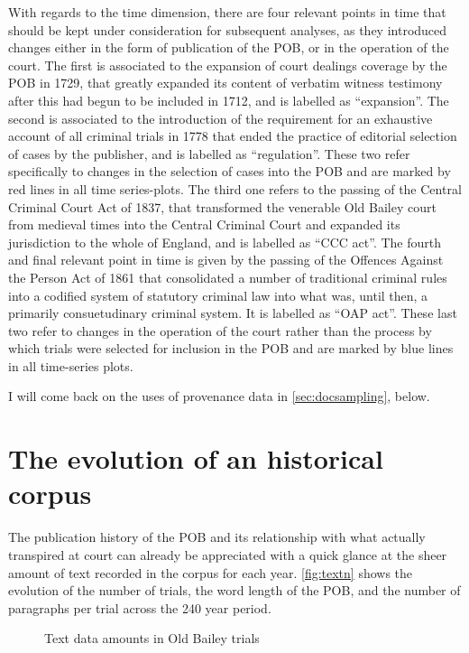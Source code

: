 With regards to the time dimension, there are four relevant points in time that should be kept under consideration for subsequent analyses, as they introduced changes either in the form of publication of the POB, or in the operation of the court.
The first is associated to the expansion of court dealings coverage by the POB in 1729, that greatly expanded its content of verbatim witness testimony after this had begun to be included in 1712, and is labelled as ``expansion''.
The second is associated to the introduction of the requirement for an exhaustive account of all criminal trials in 1778 that ended the practice of editorial selection of cases by the publisher, and is labelled as ``regulation''.
These two refer specifically to changes in the selection of cases into the POB and are marked by red lines in all time series-plots.
The third one refers to the passing of the Central Criminal Court Act of 1837, that transformed the venerable Old Bailey court from medieval times into the Central Criminal Court and expanded its jurisdiction to the whole of England, and is labelled as ``CCC act''.
The fourth and final relevant point in time is given by the passing of the Offences Against the Person Act of 1861 that consolidated a number of traditional criminal rules into a codified system of statutory criminal law into what was, until then, a primarily consuetudinary criminal system. It is labelled as ``OAP act''.
These last two refer to changes in the operation of the court rather than the process by which trials were selected for inclusion in the POB and are marked by blue lines in all time-series plots.

I will come back on the uses of provenance data in \autoref{sec:docsampling}, below.

\section{The evolution of an historical corpus}
\label{sec:lexstats}

The publication history of the POB and its relationship with what actually transpired at court can already be appreciated with a quick glance at the sheer amount of text recorded in the corpus for each year.
\autoref{fig:textn} shows the evolution of the number of trials, the word length of the POB, and the number of paragraphs per trial across the 240 year period.

\begin{figure}
    \centerfloat
    
    \caption{Text data amounts in Old Bailey trials}
    \label{fig:textn}
\end{figure}

